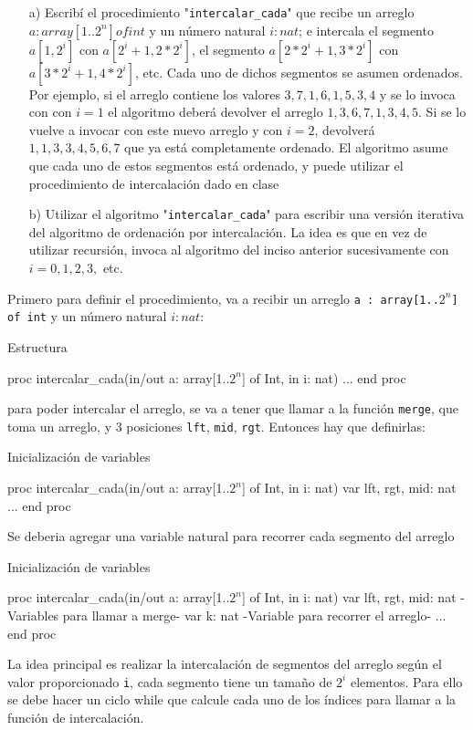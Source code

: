 \begin{itemize}
    \item[a)] Escribí el procedimiento "\texttt{intercalar\_cada}" que recibe un arreglo $a : array[1..2^n] of int$ y un número natural $i : nat$; e intercala el segmento $a[1, 2^i]$ con $a[2^i + 1, 2 * 2^i]$, el segmento $a[2 * 2^i + 1, 3 * 2^i]$ con $a[3 * 2^i + 1, 4 * 2^i]$, etc. Cada uno de dichos segmentos se asumen ordenados. Por ejemplo, si el arreglo contiene los valores $3, 7, 1, 6, 1, 5, 3, 4$ y se lo invoca con con $i = 1$ el algoritmo deberá devolver el arreglo $1, 3, 6, 7, 1, 3, 4, 5$. Si se lo vuelve a invocar con este nuevo arreglo y con $i = 2$, devolverá $1, 1, 3, 3, 4, 5, 6, 7$ que ya está completamente ordenado. El algoritmo asume que cada uno de estos segmentos está ordenado, y puede utilizar el procedimiento de intercalación dado en clase
    \item[b)] Utilizar el algoritmo "\texttt{intercalar\_cada}" para escribir una versión iterativa del algoritmo de ordenación por intercalación. La idea es que en vez de utilizar recursión, invoca al algoritmo del inciso anterior sucesivamente con $i = 0, 1, 2, 3,$ etc.
\end{itemize}

Primero para definir el procedimiento, va a recibir un arreglo \texttt{a : array[1..$2^n$] of int} y un número natural $i : nat$:

\begin{codebox}{Estructura}
\begin{pascallike}
proc intercalar_cada(in/out a: array[1..$2^n$] of Int, in i: nat)
...
end proc
\end{pascallike}
\end{codebox}
para poder intercalar el arreglo, se va a tener que llamar a la función \texttt{merge}, que toma un arreglo, y 3 posiciones \texttt{lft}, \texttt{mid}, \texttt{rgt}. Entonces hay que definirlas:

\begin{codebox}{Inicialización de variables}
\begin{pascallike}
proc intercalar_cada(in/out a: array[1..$2^n$] of Int, in i: nat)
    var lft, rgt, mid: nat
    ...
end proc
\end{pascallike}
\end{codebox}
Se deberia agregar una variable natural para recorrer cada segmento del arreglo

\begin{codebox}{Inicialización de variables}
\begin{pascallike}
proc intercalar_cada(in/out a: array[1..$2^n$] of Int, in i: nat)
    var lft, rgt, mid: nat {-Variables para llamar a merge-}
    var k: nat {-Variable para recorrer el arreglo-}
    ...
end proc
\end{pascallike}
\end{codebox}
La idea principal es realizar la intercalación de segmentos del arreglo según el valor proporcionado \texttt{i}, cada segmento tiene un tamaño de $2^i$ elementos. Para ello se debe hacer un ciclo while que calcule cada uno de los índices para llamar a la función de intercalación.

